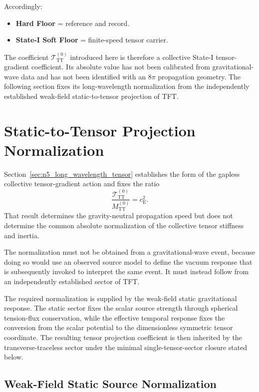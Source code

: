 Accordingly:
\begin{itemize}
    \item \textbf{Hard Floor} = reference and record.
    \item \textbf{State-I Soft Floor} = finite-speed tensor carrier.
\end{itemize}

The coefficient $\mathcal{T}_{\mathrm{TT}}^{(0)}$ introduced here is therefore a collective State-I tensor-gradient coefficient. Its absolute value has not been calibrated from gravitational-wave data and has not been identified with an $8\pi$ propagation geometry. The following section fixes its long-wavelength normalization from the independently established weak-field static-to-tensor projection of TFT.

\section{Static-to-Tensor Projection Normalization}
\label{sec:n6_static_tensor_normalization}

Section~\ref{sec:n5_long_wavelength_tensor} establishes the form of the gapless collective tensor-gradient action and fixes the ratio
\begin{equation}
    \frac{\mathcal{T}_{\mathrm{TT}}^{(0)}}{M_{\mathrm{TT}}^{(0)}} = c_{\mathrm{E}}^{2}.
\end{equation}
That result determines the gravity-neutral propagation speed but does not determine the common absolute normalization of the collective tensor stiffness and inertia.

The normalization must not be obtained from a gravitational-wave event, because doing so would use an observed source model to define the vacuum response that is subsequently invoked to interpret the same event. It must instead follow from an independently established sector of TFT.

The required normalization is supplied by the weak-field static gravitational response. The static sector fixes the scalar source strength through spherical tension-flux conservation, while the effective temporal response fixes the conversion from the scalar potential to the dimensionless symmetric tensor coordinate. The resulting tensor projection coefficient is then inherited by the transverse-traceless sector under the minimal single-tensor-sector closure stated below.

\subsection{Weak-Field Static Source Normalization}
\label{subsec:n6_static_source_normalization}


